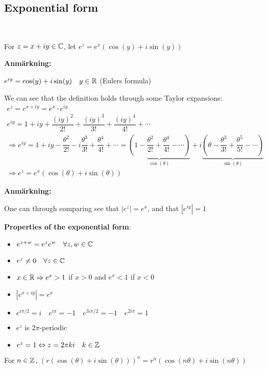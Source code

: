 \subsection{Exponential form}\hfill\\\par
\begin{theo}[]{}
  For $z = x+iy\in\mathbb{C}$, let $e^z = e^x(\cos(y)+i\sin(y))$
\end{theo}
\par\bigskip
\noindent\textbf{Anmärkning:}\par
\noindent $e^{iy} = \cos(y)+i\sin(y)\quad y\in\mathbb{R}$ (Eulers formula)
\par\bigskip
\noindent We can see that the definition holds through some Taylor expansions:
\begin{equation*}
  \begin{gathered}
    e^z = e^{x+iy} = e^x\cdot e^{iy}\\
    e^{iy} = 1+iy+\dfrac{(iy)^2}{2!}+\dfrac{(iy)^3}{3!}+\dfrac{(iy)^4}{4!}+\cdots\\
    \Rightarrow e^{iy} = 1+iy-\dfrac{\theta^2}{2!}-i\dfrac{\theta^3}{3!}+\dfrac{\theta^4}{4!}+\cdots = \underbrace{\left(1-\dfrac{\theta^2}{2!}+\dfrac{\theta^4}{4!}-\cdots\right)}_{\text{$\cos(\theta)$}}+i\underbrace{\left(\theta-\dfrac{\theta^3}{3!}+\dfrac{\theta^5}{5!}-\cdots\right)}_{\text{$\sin(\theta)$}}\\
    \Rightarrow e^z = e^x(\cos(\theta)+i\sin(\theta))
  \end{gathered}
\end{equation*}
\par\bigskip
\noindent\textbf{Anmärkning:}\par
\noindent One can through comparing see that $\left|e^z\right| = e^x$, and that $\left|e^{iy}\right|= 1$
\par\bigskip
\noindent\textbf{Properties of the exponential form}:\par
\begin{itemize}
  \item $e^{z+w} = e^ze^w\quad\forall z,w\in\mathbb{C}$
  \item $e^z\neq0\quad\forall z\in\mathbb{C}$
  \item $x\in\mathbb{R}\Rightarrow e^x>1$ if $x>0$ and $e^x<1$ if $x<0$
  \item $\left|e^{x+iy}\right| = e^x$
  \item $e^{i\pi/2} = i\quad e^{i\pi} = -1\quad e^{3i\pi/2} = -1\quad e^{2i\pi} = 1$
  \item $e^z$ is $2\pi$-periodic
  \item $e^z=1\Leftrightarrow z = 2\pi ki\quad k\in\mathbb{Z}$ 
\end{itemize}
\par\bigskip
\begin{theo}{}
  For $n\in\mathbb{Z}$, $(r(\cos(\theta)+i\sin(\theta)))^n = r^n(\cos(n\theta)+i\sin(n\theta))$ 
\end{theo}
\par\bigskip
